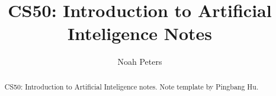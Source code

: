 \documentclass[a4paper]{report}
\author{Noah Peters}
\title{CS50: Introduction to Artificial Inteligence Notes}
\begin{document}
\maketitle

\begin{abstract}
	CS50: Introduction to Artificial Inteligence notes. Note template by Pingbang Hu.
\end{abstract}

\newpage

\tableofcontents


\newpage
\appendix
\appendixpage



\newpage
\printbibliography
\end{document}
